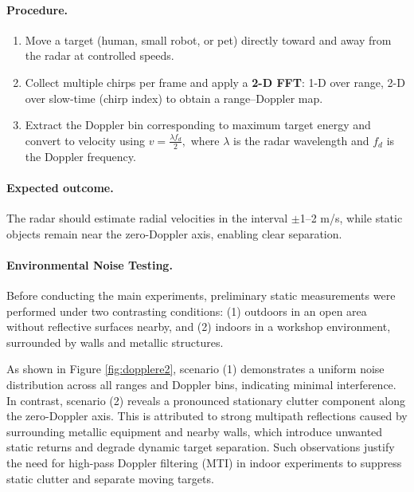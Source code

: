\paragraph{Procedure.}
\begin{enumerate}
    \item Move a target (human, small robot, or pet) directly toward and away from the radar at controlled speeds.
    \item Collect multiple chirps per frame and apply a \textbf{2-D FFT}: 1-D over range, 2-D over slow-time (chirp index) to obtain a range–Doppler map.
    \item Extract the Doppler bin corresponding to maximum target energy and convert to velocity using
    $
        v = \frac{\lambda f_d}{2},
    $
    where $\lambda$ is the radar wavelength and $f_d$ is the Doppler frequency.
\end{enumerate}

\paragraph{Expected outcome.}
The radar should estimate radial velocities in the interval $\pm$1–2 m/s, while static objects remain near the zero-Doppler axis, enabling clear separation.

\paragraph{Environmental Noise Testing.}
Before conducting the main experiments, preliminary static measurements were performed under two contrasting conditions:  
(1) outdoors in an open area without reflective surfaces nearby, and  
(2) indoors in a workshop environment, surrounded by walls and metallic structures.

As shown in Figure \ref{fig:dopplere2}, scenario (1) demonstrates a uniform noise distribution across all ranges and Doppler bins, indicating minimal interference.  
In contrast, scenario (2) reveals a pronounced stationary clutter component along the zero-Doppler axis. This is attributed to strong multipath reflections caused by surrounding metallic equipment and nearby walls, which introduce unwanted static returns and degrade dynamic target separation.  
Such observations justify the need for high-pass Doppler filtering (MTI) in indoor experiments to suppress static clutter and separate moving targets.



